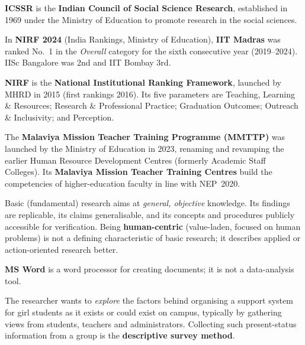 \textbf{ICSSR} is the \textbf{Indian Council of Social Science Research}, established in 1969 under the Ministry of Education to promote research in the social sciences.

In \textbf{NIRF 2024} (India Rankings, Ministry of Education), \textbf{IIT Madras} was ranked No.~1 in the \emph{Overall} category for the sixth consecutive year (2019--2024). IISc Bangalore was 2nd and IIT Bombay 3rd.

\textbf{NIRF} is the \textbf{National Institutional Ranking Framework}, launched by MHRD in 2015 (first rankings 2016). Its five parameters are Teaching, Learning \& Resources; Research \& Professional Practice; Graduation Outcomes; Outreach \& Inclusivity; and Perception.

The \textbf{Malaviya Mission Teacher Training Programme (MMTTP)} was launched by the Ministry of Education in 2023, renaming and revamping the earlier Human Resource Development Centres (formerly Academic Staff Colleges). Its \textbf{Malaviya Mission Teacher Training Centres} build the competencies of higher-education faculty in line with NEP~2020.

Basic (fundamental) research aims at \emph{general, objective} knowledge. Its findings are replicable, its claims generalisable, and its concepts and procedures publicly accessible for verification. Being \textbf{human-centric} (value-laden, focused on human problems) is not a defining characteristic of basic research; it describes applied or action-oriented research better.

\textbf{MS Word} is a word processor for creating documents; it is not a data-analysis tool.

The researcher wants to \emph{explore} the factors behind organising a support system for girl students as it exists or could exist on campus, typically by gathering views from students, teachers and administrators. Collecting such present-status information from a group is the \textbf{descriptive survey method}.

